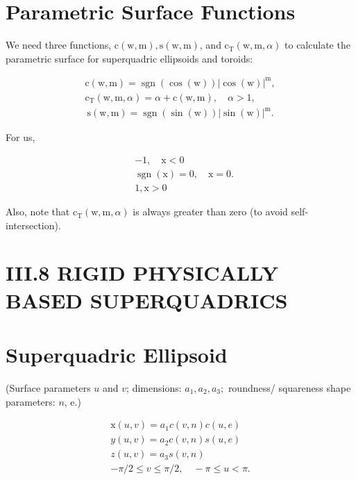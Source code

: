 \section{Parametric Surface Functions}
We need three functions, $\mathrm{c}(\mathrm{w}, \mathrm{m}), \mathrm{s}(\mathrm{w}, \mathrm{m})$, and $\mathrm{c}_{\mathrm{T}}(\mathrm{w}, \mathrm{m}, \alpha)$ to calculate the parametric surface for superquadric ellipsoids and toroids:

$$
\begin{gathered}
\mathrm{c}(\mathrm{w}, \mathrm{m})=\operatorname{sgn}(\cos (\mathrm{w}))|\cos (\mathrm{w})|^{\mathrm{m}}, \\
\mathrm{c}_{\mathrm{T}}(\mathrm{w}, \mathrm{m}, \alpha)=\alpha+\mathrm{c}(\mathrm{w}, \mathrm{m}), \quad \alpha>1, \\
\mathrm{~s}(\mathrm{w}, \mathrm{m})=\operatorname{sgn}(\sin (\mathrm{w}))|\sin (\mathrm{w})|^{\mathrm{m}} .
\end{gathered}
$$

For us,

$$
\begin{aligned}
& -1, \quad \mathrm{x}<0 \\
& \operatorname{sgn}(\mathrm{x})=0, \quad \mathrm{x}=0 . \\
& 1, \mathrm{x}>0
\end{aligned}
$$

Also, note that $\mathrm{c}_{\mathrm{T}}(\mathrm{w}, \mathrm{m}, \alpha)$ is always greater than zero (to avoid self-intersection).

\section{III.8 RIGID PHYSICALLY BASED SUPERQUADRICS}
\section{Superquadric Ellipsoid}
(Surface parameters $u$ and $v$; dimensions: $a_{1}, a_{2}, a_{3} ;$ roundness/ squareness shape parameters: $n$, e.)

$$
\begin{gathered}
\mathrm{x}(u, v)=a_{1} c(v, n) c(u, e) \\
y(u, v)=a_{2} c(v, n) s(u, e) \\
z(u, v)=a_{3} s(v, n) \\
-\pi / 2 \leq v \leq \pi / 2, \quad-\pi \leq u<\pi .
\end{gathered}
$$

